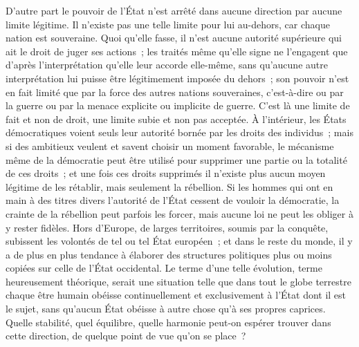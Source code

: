 \documentclass[french,twoside]{book} %
\begin{document}
D'autre part le pouvoir de l'État n'est arrêté dans aucune direction par aucune limite légitime. Il n'existe pas une telle limite pour lui au-dehors, car chaque nation est souveraine. Quoi qu'elle fasse, il n'est aucune autorité supé­rieure qui ait le droit de juger ses actions ; les traités même qu'elle signe ne l'engagent que d'après l'interprétation qu'elle leur accorde elle-même, sans qu'aucune autre interprétation lui puisse être légitimement imposée du dehors ; son pouvoir n'est en fait limité que par la force des autres nations souveraines, c'est-à-dire ou par la guerre ou par la menace explicite ou implicite de guerre. C'est là une limite de fait et non de droit, une limite subie et non pas acceptée. À l'intérieur, les États démocratiques voient seuls leur autorité bornée par les droits des individus ; mais si des ambitieux veulent et savent choisir un moment favorable, le mécanisme même de la démocratie peut être utilisé pour supprimer une partie ou la totalité de ces droits ; et une fois ces droits supprimés il n'existe plus aucun moyen légitime de les rétablir, mais seulement la rébellion. Si les hommes qui ont en main à des titres divers l'autorité de l'État cessent de vouloir la démocratie, la crainte de la rébellion peut parfois les forcer, mais aucune loi ne peut les obliger à y rester fidèles. Hors d'Europe, de larges territoires, soumis par la conquête, subissent les volontés de tel ou tel État européen ; et dans le reste du monde, il y a de plus en plus tendance à élaborer des structures politiques plus ou moins copiées sur celle de l'État occidental. Le terme d'une telle évolution, terme heureusement théorique, serait une situation telle que dans tout le globe terrestre chaque être humain obéisse continuellement et exclusivement à l'État dont il est le sujet, sans qu'aucun État obéisse à autre chose qu'à ses propres caprices. Quelle stabilité, quel équilibre, quelle harmonie peut-on espérer trouver dans cette direction, de quelque point de vue qu'on se place ?\par
\end{document}
